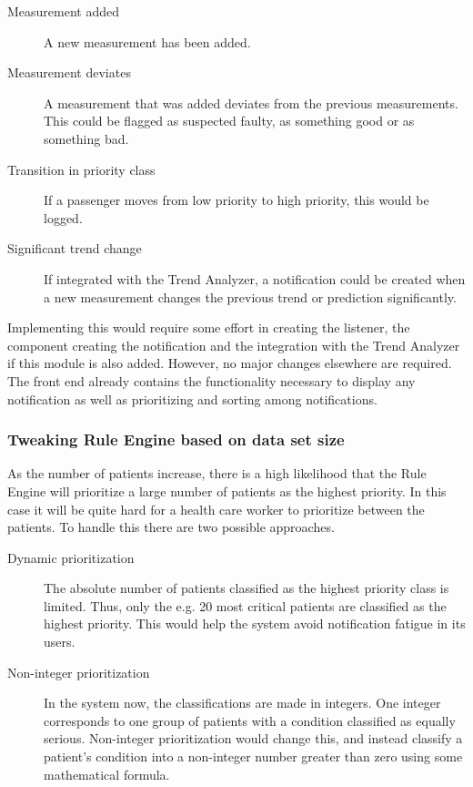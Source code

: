 \documentclass{article}
\begin{document}
\begin{description}
\item [Measurement added] A new measurement has been added.
\item [Measurement deviates] A measurement that was added deviates from the previous measurements. This could be flagged as suspected faulty, as something good or as something bad.
\item [Transition in priority class] If a passenger moves from low priority to high priority, this would be logged.
\item [Significant trend change] If integrated with the Trend Analyzer, a notification could be created when a new measurement changes the previous trend or prediction significantly.
\end{description}

Implementing this would require some effort in creating the listener, the component creating the notification and the integration with the Trend Analyzer if this module is also added. However, no major changes elsewhere are required. The front end already contains the functionality necessary to display any notification as well as prioritizing and sorting among notifications.

\subsubsection{Tweaking Rule Engine based on data set size}\label{future-prioritization}
As the number of patients increase, there is a high likelihood that the Rule Engine will prioritize a large number of patients as the highest priority. In this case it will be quite hard for a health care worker to prioritize between the patients. To handle this there are two possible approaches.

\begin{description}
\item [Dynamic prioritization] The absolute number of patients classified as the highest priority class is limited. Thus, only the e.g. 20 most critical patients are classified as the highest priority. This would help the system avoid notification fatigue in its users. 
\item [Non-integer prioritization] In the system now, the classifications are made in integers. One integer corresponds to one group of patients with a condition classified as equally serious. Non-integer prioritization would change this, and instead classify a patient's condition into a non-integer number greater than zero using some mathematical formula.
\end{description}
\end{document}
